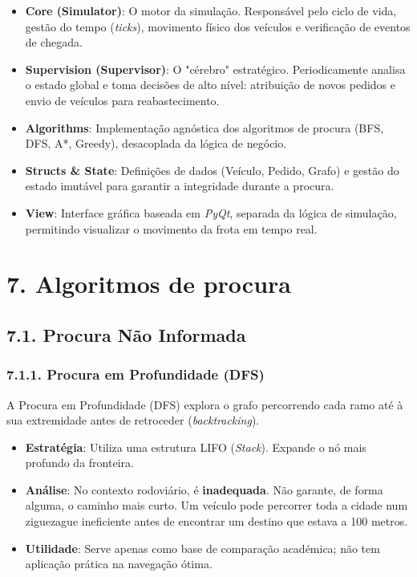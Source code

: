 \documentclass[a4paper]{article}
\begin{document}
\begin{itemize}
    \item \textbf{Core (Simulator)}: O motor da simulação. Responsável pelo ciclo de vida, gestão do tempo (\textit{ticks}), movimento físico dos veículos e verificação de eventos de chegada.
    \item \textbf{Supervision (Supervisor)}: O "cérebro" estratégico. Periodicamente analisa o estado global e toma decisões de alto nível: atribuição de novos pedidos e envio de veículos para reabastecimento.
    \item \textbf{Algorithms}: Implementação agnóstica dos algoritmos de procura (BFS, DFS, A*, Greedy), desacoplada da lógica de negócio.
    \item \textbf{Structs \& State}: Definições de dados (Veículo, Pedido, Grafo) e gestão do estado imutável para garantir a integridade durante a procura.
    \item \textbf{View}: Interface gráfica baseada em \textit{PyQt}, separada da lógica de simulação, permitindo visualizar o movimento da frota em tempo real.
\end{itemize}




\section*{7. Algoritmos de procura}

\subsection*{7.1. Procura Não Informada}

\subsubsection*{7.1.1. Procura em Profundidade (DFS)}
\noindent A Procura em Profundidade (DFS) explora o grafo percorrendo cada ramo até à sua extremidade antes de retroceder (\textit{backtracking}).
\begin{itemize}
    \item \textbf{Estratégia}: Utiliza uma estrutura LIFO (\textit{Stack}). Expande o nó mais profundo da fronteira.
    \item \textbf{Análise}: No contexto rodoviário, é \textbf{inadequada}. Não garante, de forma alguma, o caminho mais curto. Um veículo pode percorrer toda a cidade num ziguezague ineficiente antes de encontrar um destino que estava a 100 metros.
    \item \textbf{Utilidade}: Serve apenas como base de comparação académica; não tem aplicação prática na navegação ótima.
\end{itemize}
\end{document}
